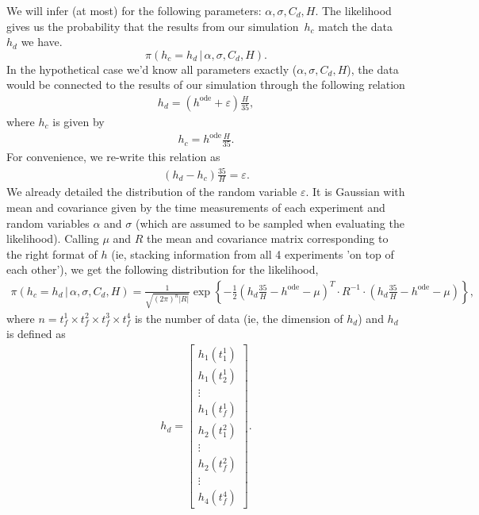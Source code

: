 \documentclass{article}
\begin{document}
We will infer (at most) for the following parameters: $\alpha, \sigma,
C_d, H$. The likelihood gives us the probability that the results from
our simulation~$h_c$ match the data~$h_d$ we have. 
\[ \pi\left( h_c = h_d \, | \, \alpha, \sigma, C_d, H \right) .\] 
In the hypothetical case we'd know all parameters exactly ($\alpha,
\sigma, C_d, H$), the data would be connected to the results of our
simulation through the following relation 
\begin{align*}
 h_d = \left( h^\text{ode} + \varepsilon \right) \frac{H}{35} , 
\end{align*}
where $h_c$ is given by
\begin{align*}
 h_c = h^\text{ode} \frac{H}{35}.
\end{align*}
For convenience, we re-write this relation as
\begin{align*}
\left( h_d - h_c \right)\frac{35}H  = \varepsilon.
\end{align*}
We already detailed the distribution of the random variable
$\varepsilon$. It is Gaussian with mean and covariance given by the time
measurements of each experiment and random variables $\alpha$ and
$\sigma$ (which are assumed to be sampled when evaluating the
likelihood). Calling $\mu$ and $R$ the mean and covariance matrix
corresponding to the right format of $h$ (ie, stacking information from
all 4 experiments 'on top of each other'), we get the following
distribution for the likelihood, 
\begin{align*}
 \pi(h_c = h_d \, | \, \alpha, \sigma, C_d, H) = \frac1{\sqrt{(2\pi)^n |R|}} \exp \left\{ - \frac12 \left(  h_d \frac{35}H - h^\text{ode} - \mu \right)^T \cdotp R^{-1} \cdotp \left(  h_d \frac{35}H - h^\text{ode} - \mu \right) \right\} ,
\end{align*}
where $n = t_f^1 \times t_f^2 \times t_f^3 \times t_f^4$ is the number
of data (ie, the dimension of $h_d$) and $h_d$ is defined as 
\begin{align*}
 h_d = \begin{bmatrix}
h_1(t_1^1) \\
h_1(t_2^1) \\
\vdots \\
h_1 (t_f^1) \\
h_2(t_1^2) \\
\vdots \\
h_2(t_f^2) \\
\vdots \\
h_4(t_f^4) 
\end{bmatrix}.
\end{align*}
\end{document}
